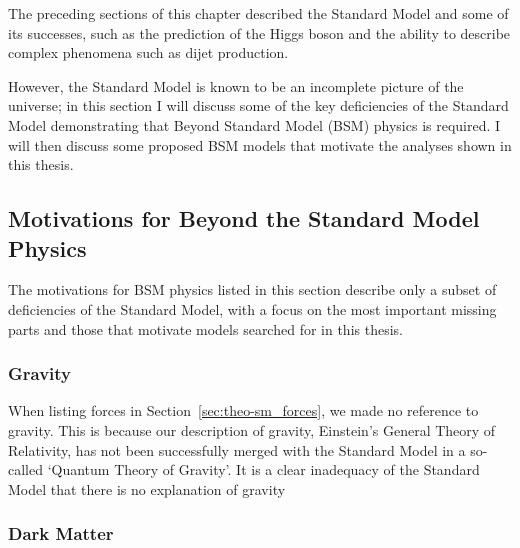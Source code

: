 The preceding sections of this chapter described the Standard Model
and some of its successes,
such as the prediction of the Higgs boson and the ability to describe complex phenomena such as dijet production.

However, the Standard Model is known to be an incomplete picture of the universe;
in this section I will discuss some of the key deficiencies of the Standard Model demonstrating
that Beyond Standard Model (BSM) physics is required.
I will then discuss some proposed BSM models that motivate the analyses shown in this thesis.

\subsection{Motivations for Beyond the Standard Model Physics}

The motivations for BSM physics listed in this section
describe only a subset of deficiencies of the Standard Model,
with a focus on the most important missing parts and
those that motivate models searched for in this thesis.

\subsubsection{Gravity}

When listing forces in Section~\ref{sec:theo-sm_forces}, we made no reference to gravity.
This is because our description of gravity, Einstein's General Theory of Relativity,
has not been successfully merged with the Standard Model in a so-called `Quantum Theory of Gravity'.
It is a clear inadequacy of the Standard Model that there is no explanation of gravity

\subsubsection{Dark Matter}
\label{sec:theo_bsm_dm}


